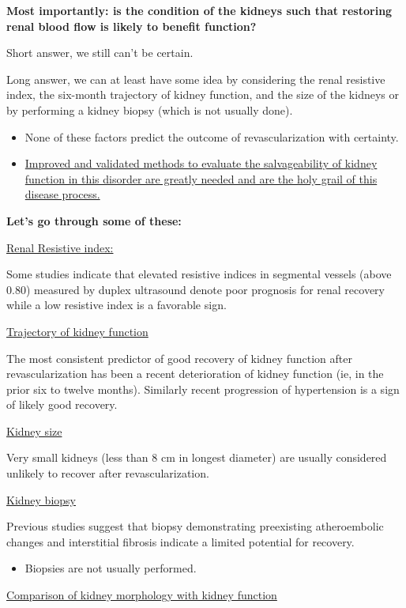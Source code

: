 \documentclass[
]{book}
\providecommand{\tightlist}{%
  \setlength{\itemsep}{0pt}\setlength{\parskip}{0pt}}
\begin{document}
\textbf{Most importantly: is the condition of the kidneys such that restoring
renal blood flow is likely to benefit function?}

Short answer, we still can't be certain.

Long answer, we can at least have some idea by considering the renal
resistive index, the six-month trajectory of kidney function, and the
size of the kidneys or by performing a kidney biopsy (which is not
usually done).

\begin{itemize}
\item
  None of these factors predict the outcome of revascularization with
  certainty.
\item
  \uline{Improved and validated methods to evaluate the salvageability of
  kidney function in this disorder are greatly needed and are the holy
  grail of this disease process.}
\end{itemize}

\textbf{Let's go through some of these:}

\uline{Renal Resistive index:}

Some studies indicate that elevated resistive indices in segmental
vessels (above 0.80) measured by duplex ultrasound denote poor prognosis
for renal recovery while a low resistive index is a favorable sign.

\uline{Trajectory of kidney function}

The most consistent predictor of good recovery of kidney function after
revascularization has been a recent deterioration of kidney function
(ie, in the prior six to twelve months). Similarly recent progression of
hypertension is a sign of likely good recovery.

\uline{Kidney size}

Very small kidneys (less than 8 cm in longest diameter) are usually
considered unlikely to recover after revascularization.

\uline{Kidney biopsy}

Previous studies suggest that biopsy demonstrating preexisting
atheroembolic changes and interstitial fibrosis indicate a limited
potential for recovery.

\begin{itemize}
\tightlist
\item
  Biopsies are not usually performed.
\end{itemize}

\uline{Comparison of kidney morphology with kidney function}
\end{document}
